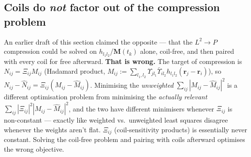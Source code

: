 \documentclass{article}
\begin{document}
\subsection{Coils do \emph{not} factor out of the compression problem}
\label{sec:coils_dont_factor}

An earlier draft of this section claimed the opposite — that the $L^2\to P$ compression could be
solved on $h_{l_1l_2}$/$\mathbf{M}(t_k)$ alone, coil-free, and then paired with every coil for
free afterward. \textbf{That is wrong.} The target of compression is $N_{ij}=\Xi_{ij}M_{ij}$
(Hadamard product, $M_{ij}:=\sum_{l_1,l_2}\Upsilon_{jl_1}\bar\Upsilon_{il_2}h_{l_1l_2}(\mathbf{r}_j-\mathbf{r}_i)$),
so $N_{ij}-\hat N_{ij} = \Xi_{ij}(M_{ij}-\hat M_{ij})$. Minimising the \emph{unweighted}
$\sum_{ij}|M_{ij}-\hat M_{ij}|^2$ is a different optimisation problem from minimising the
\emph{actually relevant} $\sum_{ij}|\Xi_{ij}|^2|M_{ij}-\hat M_{ij}|^2$, and the two have different
minimisers whenever $\Xi_{ij}$ is non-constant — exactly like weighted vs.\ unweighted least
squares disagree whenever the weights aren't flat. $\Xi_{ij}$ (coil-sensitivity products) is
essentially never constant. Solving the coil-free problem and pairing with coils afterward
optimises the wrong objective.
\end{document}
